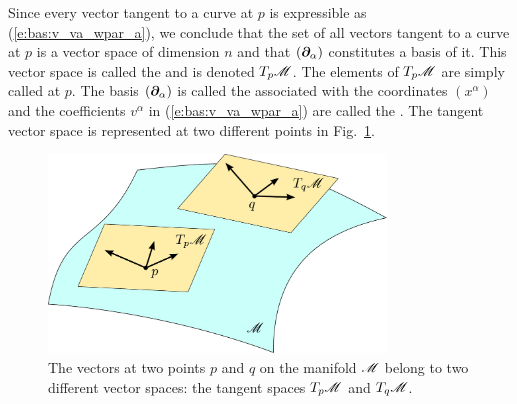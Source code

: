 \ee
Since every vector tangent to a curve at $p$ is expressible as (\ref{e:bas:v_va_wpar_a}), we conclude that
the set of all vectors tangent to a curve at $p$ is a vector space of dimension $n$ and that $(\bm{\partial}_\alpha)$ constitutes a basis of it. This vector space is
called the
 and is denoted $T_p\mathscr{M}$.
The elements of $T_p\mathscr{M}$ are simply called  at $p$.
The basis $(\bm{\partial}_\alpha)$ is called the  associated with
the coordinates $(x^\alpha)$ and the coefficients $v^\alpha$ in (\ref{e:bas:v_va_wpar_a}) are called the .
The tangent vector space is represented at two different points in Fig.~\ref{f:bas:tang_space}.

\begin{figure}
\centerline{\includegraphics[width=0.8\textwidth]{bas_tang_space.pdf}}
\caption[]{\label{f:bas:tang_space} \footnotesize
The vectors at two points $p$ and $q$ on the
manifold $\mathscr{M}$ belong to two different vector spaces:
the tangent spaces $T_p\mathscr{M}$ and $T_q\mathscr{M}$.}
\end{figure}

